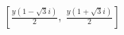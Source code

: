 \documentclass[preview]{standalone}
\begin{document}
\begin{align*}
\left[ \frac{y \left(1 - \sqrt{3} i\right)}{2}, \  \frac{y \left(1 + \sqrt{3} i\right)}{2}\right]
\end{align*}
\end{document}

